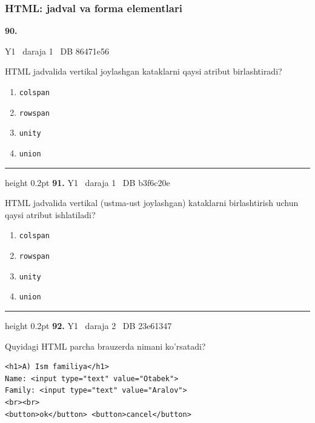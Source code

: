 \documentclass[10pt,a4paper,oneside]{article}
\begin{document}
\subsubsection{HTML: jadval va forma elementlari}
\hypertarget{q90}{\textbf{\color{ink}90.}}  {\color{muted}\scriptsize Y1 \textbullet\ daraja 1 \textbullet\ DB 86471e56}
\par
HTML jadvalida vertikal joylashgan kataklarni qaysi atribut birlashtiradi?
\begin{enumerate}[label=\Alph*),leftmargin=9mm]
\item \texttt{colspan}
\item \texttt{rowspan}
\item \texttt{unity}
\item \texttt{union}
\end{enumerate}
\vspace{2mm}\hrule height 0.2pt \vspace{4mm}
\hypertarget{q91}{\textbf{\color{ink}91.}}  {\color{muted}\scriptsize Y1 \textbullet\ daraja 1 \textbullet\ DB b3f6c20e}
\par
HTML jadvalida vertikal (ustma-ust joylashgan) kataklarni birlashtirish uchun qaysi atribut ishlatiladi?
\begin{enumerate}[label=\Alph*),leftmargin=9mm]
\item \texttt{colspan}
\item \texttt{rowspan}
\item \texttt{unity}
\item \texttt{union}
\end{enumerate}
\vspace{2mm}\hrule height 0.2pt \vspace{4mm}
\hypertarget{q92}{\textbf{\color{ink}92.}}  {\color{muted}\scriptsize Y1 \textbullet\ daraja 2 \textbullet\ DB 23e61347}
\par
Quyidagi HTML parcha brauzerda nimani ko'rsatadi?

\par
\begin{lstlisting}
<h1>A) Ism familiya</h1>
Name: <input type="text" value="Otabek">
Family: <input type="text" value="Aralov">
<br><br>
<button>ok</button> <button>cancel</button>
\end{lstlisting}
\end{document}
